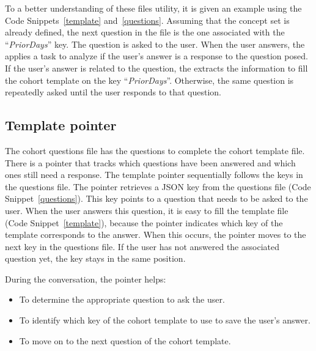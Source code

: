 To a better understanding of these files utility, it is given an example using the Code Snippets~\ref{template} and~\ref{questions}. Assuming that the concept set is already defined, the next question in the file is the one associated with the ``\textit{PriorDays}'' key. The question is asked to the user. When the user answers, the {\llm} applies a {\nlu} task to analyze if the user's answer is a response to the question posed. If the user's answer is related to the question, the {\llm} extracts the information to fill the cohort template on the key ``\textit{PriorDays}''. Otherwise, the same question is repeatedly asked until the user responds to that question. 


\subsection{Template pointer}




The cohort questions file has the questions to complete the cohort template file. There is a pointer that tracks which questions have been answered and which ones still need a response. The template pointer sequentially follows the keys in the questions file. The pointer retrieves a JSON key from the questions file (Code Snippet~\ref{questions}). This key points to a question that needs to be asked to the user. When the user answers this question, it is easy to fill the template file (Code Snippet~\ref{template}), because the pointer indicates which key of the template corresponds to the answer. When this occurs, the pointer moves to the next key in the questions file. If the user has not answered the associated question yet, the key stays in the same position.

During the conversation, the pointer helps:

\begin{itemize}
  \item To determine the appropriate question to ask the user.
  \item To identify which key of the cohort template to use to save the user's answer.
  \item To move on to the next question of the cohort template.
\end{itemize}

